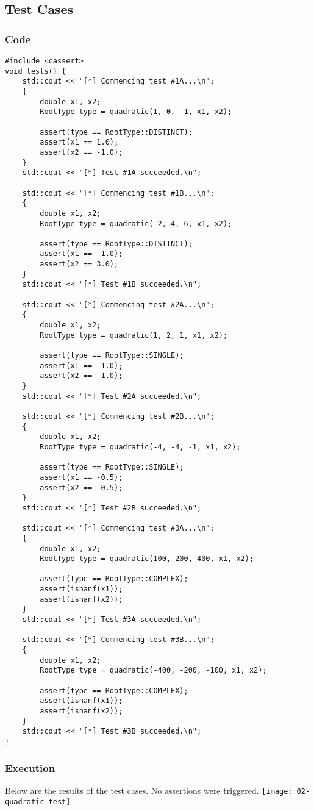 \documentclass[12pt]{article}
\begin{document}
\subsection{Test Cases}
\subsubsection{Code}
\begin{verbatim}
#include <cassert>
void tests() {
    std::cout << "[*] Commencing test #1A...\n";
    {
        double x1, x2;
        RootType type = quadratic(1, 0, -1, x1, x2);

        assert(type == RootType::DISTINCT);
        assert(x1 == 1.0);
        assert(x2 == -1.0);
    }
    std::cout << "[*] Test #1A succeeded.\n";

    std::cout << "[*] Commencing test #1B...\n";
    {
        double x1, x2;
        RootType type = quadratic(-2, 4, 6, x1, x2);

        assert(type == RootType::DISTINCT);
        assert(x1 == -1.0);
        assert(x2 == 3.0);
    }
    std::cout << "[*] Test #1B succeeded.\n";

    std::cout << "[*] Commencing test #2A...\n";
    {
        double x1, x2;
        RootType type = quadratic(1, 2, 1, x1, x2);

        assert(type == RootType::SINGLE);
        assert(x1 == -1.0);
        assert(x2 == -1.0);
    }
    std::cout << "[*] Test #2A succeeded.\n";

    std::cout << "[*] Commencing test #2B...\n";
    {
        double x1, x2;
        RootType type = quadratic(-4, -4, -1, x1, x2);

        assert(type == RootType::SINGLE);
        assert(x1 == -0.5);
        assert(x2 == -0.5);
    }
    std::cout << "[*] Test #2B succeeded.\n";

    std::cout << "[*] Commencing test #3A...\n";
    {
        double x1, x2;
        RootType type = quadratic(100, 200, 400, x1, x2);

        assert(type == RootType::COMPLEX);
        assert(isnanf(x1));
        assert(isnanf(x2));
    }
    std::cout << "[*] Test #3A succeeded.\n";

    std::cout << "[*] Commencing test #3B...\n";
    {
        double x1, x2;
        RootType type = quadratic(-400, -200, -100, x1, x2);

        assert(type == RootType::COMPLEX);
        assert(isnanf(x1));
        assert(isnanf(x2));
    }
    std::cout << "[*] Test #3B succeeded.\n";
}
\end{verbatim}
\subsubsection{Execution}
Below are the results of the test cases. No assertions were triggered.
\newline\texttt{[image: 02-quadratic-test]}
\end{document}
